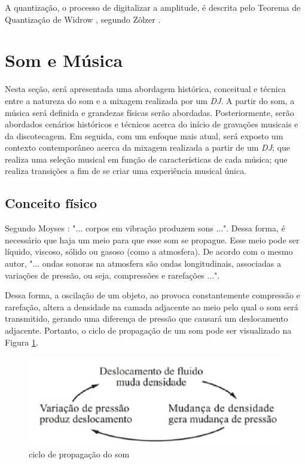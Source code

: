 A quantização, o processo de digitalizar a amplitude, é descrita pelo Teorema de Quantização de Widrow \cite{widrow}, segundo  Zölzer \cite{zolzer2008digital}.


\section{Som e Música}
Nesta seção, será apresentada uma abordagem histórica, conceitual e técnica entre a natureza do som e a mixagem realizada por um \textit{DJ}. A partir do som, a música será definida e grandezas físicas serão abordadas. Posteriormente, serão abordados cenários históricos e técnicos acerca do início de gravações musicais e da discotecagem. Em seguida, com um enfoque mais atual, será exposto um contexto contemporâneo acerca da mixagem realizada a partir de um \textit{DJ}; que realiza uma seleção musical em função de características de cada música; que realiza transições a fim de se criar uma experiência musical única.

\subsection{Conceito físico}
Segundo Moyses \cite{moyses}: "... corpos em vibração produzem sons ...". Dessa forma, é necessário que haja um meio para que esse som se propague. Esse meio pode ser líquido, viscoso, sólido ou gasoso (como a atmosfera). De acordo com o mesmo autor, "... ondas sonoras na atmosfera são ondas longitudinais, associadas a variações de pressão, ou seja, compressões e rarefações ...". \par Dessa forma, a oscilação de um objeto, ao provoca constantemente compressão e rarefação, altera a densidade na camada adjacente ao meio pelo qual o som será transmitido, gerando uma diferença de pressão que causará um deslocamento adjacente. Portanto, o ciclo de propagação de um som pode ser visualizado na Figura \ref{fig07}.

\begin{figure}[h]
	\centering
    \includegraphics[scale=0.7]{figuras/fig07.eps}
	\caption{ciclo de propagação do som \cite{moyses}}
	\label{fig07}
\end{figure}

